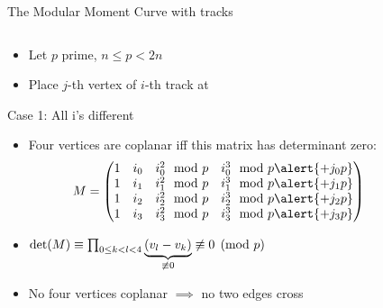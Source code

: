 \documentclass[t]{beamer}
\begin{document}
\begin{frame}{The Modular Moment Curve with tracks}
    \vspace{-0.5cm}
    \begin{columns}
	\begin{column}{0.5\textwidth}
		\begin{itemize}
		    \item <+-> Let $p$ prime, $n\le p<2n$
		    \item
			Place $j$-th vertex of $i$-th track at  \\
			\end{itemize}
			Case 1: All i's different
			\begin{itemize}
		    \item Four vertices are coplanar iff this matrix has determinant zero:
			\begin{equation*}
			    M = \begin{pmatrix}
				{1}&i_0&i_0^2\mod p&i_0^3\mod p \alert{+j_0p}\\
				{1}&i_1&i_1^2\mod p&i_1^3\mod p \alert{+j_1p}\\
				{1}&i_2&i_2^2\mod p&i_2^3\mod p \alert{+j_2p}\\
				{1}&i_3&i_3^2\mod p&i_3^3\mod p \alert{+j_3p}\\
			    \end{pmatrix}
			\end{equation*}
		    \item 
			\(\det(M) \equiv \prod_{0 \le k < l < 4} \underbrace{(v_l - v_k)}_{\not\equiv 0} \not\equiv\mathrlap{0 \pmod p}\)
		    \item No four vertices coplanar \linebreak $\implies$ no two edges cross
		\end{itemize}
	\end{column}
	    \begin{column}{0.5\textwidth}
		\begin{center}
		\end{center}
	    \end{column}
    \end{columns}
\end{frame}
\end{document}
